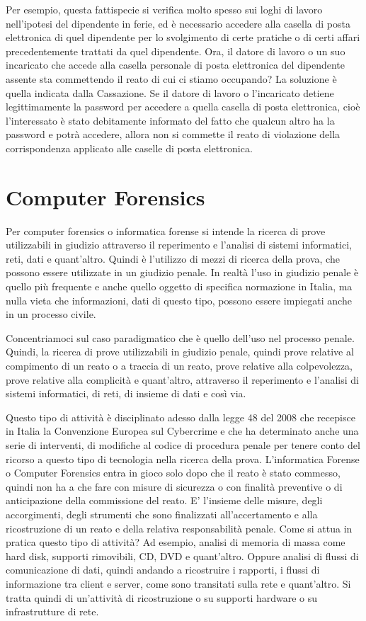 Per esempio, questa fattispecie si verifica molto spesso sui loghi di lavoro nell'ipotesi del dipendente in ferie, ed è necessario accedere alla casella di posta elettronica di quel dipendente per lo svolgimento di certe pratiche o di certi affari precedentemente trattati da quel dipendente. Ora, il datore di lavoro o un suo incaricato che accede alla casella personale di posta elettronica del dipendente assente sta commettendo il reato di cui ci stiamo occupando? La soluzione è quella indicata dalla Cassazione. Se il datore di lavoro o l'incaricato detiene legittimamente la password per accedere a quella casella di posta elettronica, cioè l'interessato è stato debitamente informato del fatto che qualcun altro ha la password e potrà accedere, allora non si commette il reato di violazione della corrispondenza applicato alle caselle di posta elettronica. 

\section{Computer Forensics}

Per computer forensics o informatica forense si intende la ricerca di prove utilizzabili in giudizio attraverso il reperimento e l'analisi di sistemi informatici, reti, dati e quant'altro. Quindi è l'utilizzo di mezzi di ricerca della prova, che possono essere utilizzate in un giudizio penale. In realtà l'uso in giudizio penale è quello più frequente e anche quello oggetto di specifica normazione in Italia, ma nulla vieta che informazioni, dati di questo tipo, possono essere impiegati anche in un processo civile. 

Concentriamoci sul caso paradigmatico che è quello dell'uso nel processo penale. 
Quindi, la ricerca di prove utilizzabili in giudizio penale, quindi prove relative al compimento di un reato o a traccia di un reato, prove relative alla colpevolezza, prove relative alla complicità e quant'altro, attraverso il reperimento e l'analisi di sistemi informatici, di reti, di insieme di dati e così via. 

Questo tipo di attività è disciplinato adesso dalla legge 48 del 2008 che recepisce in Italia la Convenzione Europea sul Cybercrime e che ha determinato anche una serie di interventi, di modifiche al codice di procedura penale per tenere conto del ricorso a questo tipo di tecnologia nella ricerca della prova. 
L'informatica Forense o Computer Forensics entra in gioco solo dopo che il reato è stato commesso, quindi non ha a che fare con misure di sicurezza o con finalità preventive o di anticipazione della commissione del reato. E' l'insieme delle misure, degli accorgimenti, degli strumenti che sono finalizzati all'accertamento e alla ricostruzione di un reato e della relativa responsabilità penale. 
Come si attua in pratica questo tipo di attività? 
Ad esempio, analisi di memoria di massa come hard disk, supporti rimovibili, CD, DVD e quant'altro. Oppure analisi di flussi di comunicazione di dati, quindi andando a ricostruire i rapporti, i flussi di informazione tra client e server, come sono transitati sulla rete e quant'altro. Si tratta quindi di un'attività di ricostruzione o su supporti hardware o su infrastrutture di rete. 


